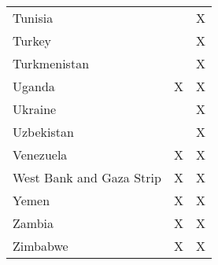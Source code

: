 \begin{table}[htbp]
\begin{tabular}{lcc}
		Tunisia                                 &                           & \cellcolor[HTML]{FBE4D5}X \\
		Turkey                                  &                           & \cellcolor[HTML]{FBE4D5}X \\
		Turkmenistan                            &                           & \cellcolor[HTML]{FBE4D5}X \\
		Uganda                                  & \cellcolor[HTML]{E2EFD9}X & \cellcolor[HTML]{E2EFD9}X \\
		Ukraine                                 &                           & \cellcolor[HTML]{FBE4D5}X \\
		Uzbekistan                              &                           & \cellcolor[HTML]{FBE4D5}X \\
		Venezuela                               & \cellcolor[HTML]{E2EFD9}X & \cellcolor[HTML]{E2EFD9}X \\
		West   Bank and Gaza Strip              & \cellcolor[HTML]{E2EFD9}X & \cellcolor[HTML]{E2EFD9}X \\
		Yemen                                   & \cellcolor[HTML]{E2EFD9}X & \cellcolor[HTML]{E2EFD9}X \\
		Zambia                                  & \cellcolor[HTML]{E2EFD9}X & \cellcolor[HTML]{E2EFD9}X \\
		Zimbabwe                                & \cellcolor[HTML]{E2EFD9}X & \cellcolor[HTML]{E2EFD9}X \\ \bottomrule
	\end{tabular}
\end{table}

\newpage
